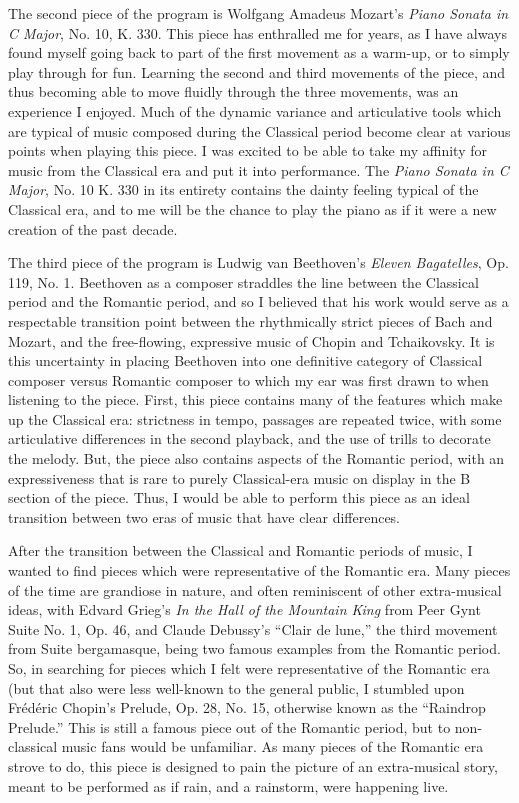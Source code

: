The second piece of the program is Wolfgang Amadeus Mozart's \textit{Piano Sonata in C Major}, No. 10, K. 330. This piece has enthralled me for years, as I have always found myself going back to part of the first movement as a warm-up, or to simply play through for fun. Learning the second and third movements of the piece, and thus becoming able to move fluidly through the three movements, was an experience I enjoyed. Much of the dynamic variance and articulative tools which are typical of music composed during the Classical period become clear at various points when playing this piece. I was excited to be able to take my affinity for music from the Classical era and put it into performance. The \textit{Piano Sonata in C Major}, No. 10 K. 330 in its entirety contains the dainty feeling typical of the Classical era, and to me will be the chance to play the piano as if it were a new creation of the past decade. 

The third piece of the program is Ludwig van Beethoven's \textit{Eleven Bagatelles}, Op. 119, No. 1. Beethoven as a composer straddles the line between the Classical period and the Romantic period, and so I believed that his work would serve as a respectable transition point between the rhythmically strict pieces of Bach and Mozart, and the free-flowing, expressive music of Chopin and Tchaikovsky. It is this uncertainty in placing Beethoven into one definitive category of Classical composer versus Romantic composer to which my ear was first drawn to when listening to the piece. First, this piece contains many of the features which make up the Classical era: strictness in tempo, passages are repeated twice, with some articulative differences in the second playback, and the use of trills to decorate the melody. But, the piece also contains aspects of the Romantic period, with an expressiveness that is rare to purely Classical-era music on display in the B section of the piece. Thus, I would be able to perform this piece as an ideal transition between two eras of music that have clear differences.

After the transition between the Classical and Romantic periods of music, I wanted to find pieces which were representative of the Romantic era. Many pieces of the time are grandiose in nature, and often reminiscent of other extra-musical ideas, with Edvard Grieg's \textit{In the Hall of the Mountain King} from Peer Gynt Suite No. 1, Op. 46, and Claude Debussy's ``Clair de lune,'' the third movement from Suite bergamasque, being two famous examples from the Romantic period. So, in searching for pieces which I felt were representative of the Romantic era (but that also were less well-known to the general public, I stumbled upon Frédéric Chopin's Prelude, Op. 28, No. 15, otherwise known as the ``Raindrop Prelude.'' This is still a famous piece out of the Romantic period, but to non-classical music fans would be unfamiliar. As many pieces of the Romantic era strove to do, this piece is designed to pain the picture of an extra-musical story, meant to be performed as if rain, and a rainstorm, were happening live. 

